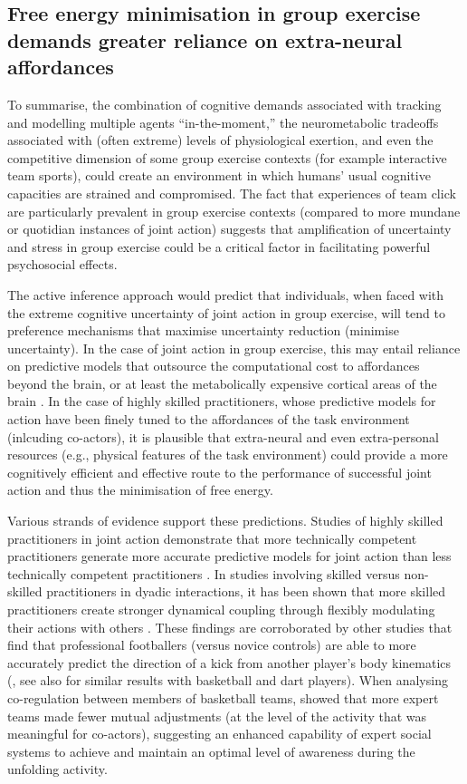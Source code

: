 \begin{CJK}{UTF8}{gbsn}
\subsection{Free energy minimisation in group exercise demands greater reliance on extra-neural affordances \label{sect:extraNeural}}
To summarise, the combination of cognitive demands associated with tracking and modelling multiple agents ``in-the-moment,'' the neurometabolic tradeoffs associated with (often extreme) levels of physiological exertion, and even the competitive dimension of some group exercise contexts (for example interactive team sports), could create an environment in which humans' usual cognitive capacities are strained and compromised.  The fact that experiences of team click are particularly prevalent in group exercise contexts (compared to more mundane or quotidian instances of joint action) suggests that amplification of uncertainty and stress in group exercise could be a critical factor in facilitating powerful psychosocial effects.

The active inference approach would predict that individuals, when faced with the extreme cognitive uncertainty of joint action in group exercise, will tend to preference mechanisms that maximise uncertainty reduction (minimise uncertainty).  In the case of joint action in group exercise, this may entail reliance on predictive models that outsource the computational cost to affordances beyond the brain, or at least the metabolically expensive cortical areas of the brain \citep{Dietrich2004,Clark2015}.  In the case of highly skilled practitioners, whose predictive models for action have been finely tuned to the affordances of the task environment (inlcuding co-actors), it is plausible that extra-neural and even extra-personal resources (e.g., physical features of the task environment) could provide a more cognitively efficient and effective route to the performance of successful joint action and thus the minimisation of free energy.

Various strands of evidence support these predictions.  Studies of highly skilled practitioners in joint action demonstrate that more technically competent practitioners generate more accurate predictive models for joint action than less technically competent practitioners \citep{Tomeo2012,Aglioti2008,Mulligan2016}.   In studies involving skilled versus non-skilled practitioners in dyadic interactions, it has been shown that more skilled practitioners create stronger dynamical coupling through flexibly modulating their actions with others \citep{Schmidt2011,Caron2017}. These findings are corroborated by other studies that find that professional footballers (versus novice controls) are able to more accurately predict the direction of a kick from another player's body kinematics (\cite{Tomeo2012}, see also \cite{Aglioti2008,Mulligan2016} for similar results with basketball and dart players).  When analysing co-regulation between members of basketball teams, \textcite{Bourbousson2015} showed that more expert teams made fewer mutual adjustments (at the level of the activity that was meaningful for co-actors), suggesting an enhanced capability of expert social systems to achieve and maintain an optimal level of awareness during the unfolding activity.


\end{CJK}
